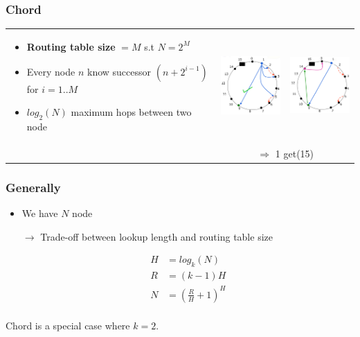 \subsubsection{Chord}

\begin{tabular}{m{10cm}m{3cm}m{3cm}}
\begin{itemize}
    \item \textbf{Routing table size} $= M$ s.t $N = 2^M$
    \item Every node $n$ know successor $(n + 2^{i-1})$ for $i = 1..M$
    \item $log_2(N)$ maximum hops between two node
\end{itemize}
& \includegraphics[width=3cm]{img/chord.png}
& \includegraphics[width=3cm]{img/chord1.png}\\
& \multicolumn{2}{c}{$\Rightarrow$ 1 get(15)}
\end{tabular}

\subsubsection{Generally}

\begin{itemize}
    \item We have $N$ node
    \item[$\to$] Trade-off between lookup length and routing table size

   \begin{eqnarray*}
            H &= log_k(N)\\
            R &=(k-1) H \\
            N &= (\frac{R}{H} + 1)^H\\
        \end{eqnarray*}
\end{itemize}

Chord is a special case where $k=2$.

